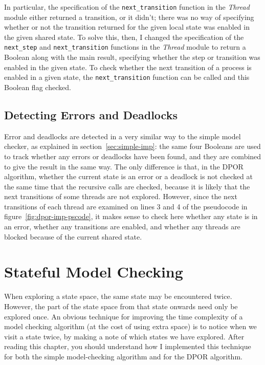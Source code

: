 \documentclass[12pt,a4paper,twoside,openright]{report}
\begin{document}
In particular, the specification of the
\texttt{next\_transition} function in the
\textit{Thread} module either returned
a transition, or it didn't; there was
no way of specifying whether or not
the transition returned for the
given local state was enabled in the
given shared state. To solve this,
then, I changed the specification
of the \texttt{next\_step} and
\texttt{next\_transition} functions
in the \textit{Thread} module to
return a Boolean along with the
main result, specifying whether
the step or transition was enabled
in the given state. To check whether
the next transition of a process is
enabled in a given state, the
\texttt{next\_transition} function
can be called and this Boolean flag
checked.

\subsection{Detecting Errors and Deadlocks}
\label{sec:dpor-imp-detecting}

Error and deadlocks are detected in a
very similar way to the simple model
checker, as explained in
section~\ref{sec:simple-imp}: the same
four Booleans are used to track whether
any errors or deadlocks have been found,
and they are combined to give the
result in the same way. The only
difference is that, in the DPOR
algorithm, whether the current
state is an error or a deadlock
is not checked at the same time
that the recursive calls are
checked, because it is likely that
the next transitions of some
threads are not explored. However,
since the next transitions of
each thread are examined on
lines 3 and 4 of the pseudocode
in figure~\ref{fig:dpor-imp-pscode},
it makes sense to check here
whether any state is in an error,
whether any transitions are enabled,
and whether any threads are blocked
because of the current shared state.

\section{Stateful Model Checking}
When exploring a state space, the same state may be
encountered twice. However, the part of the state
space from that state onwards need only be explored
once. An obvious technique for improving the
time complexity of a model checking algorithm
(at the cost of using extra space) is to notice
when we visit a state twice, by making a note
of which states we have explored. After reading
this chapter, you should understand how I
implemented this technique for both the simple
model-checking algorithm and for the
DPOR algorithm.
\end{document}
